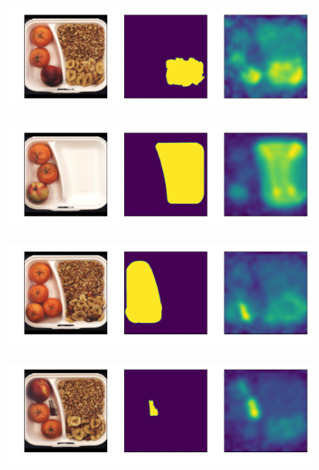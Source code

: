\begin{figure}[htbp]
    \captionsetup[subfigure]{justification=centering}
    \centering
    \begin{subfigure}[b]{0.3\textwidth}
        \centering
        \includegraphics[width=\textwidth]{figures/locopatchcoreresults/breakfast_box_test_logical_anomalies_003.png}

    \end{subfigure}
    \begin{subfigure}[b]{0.3\textwidth}
        \centering
        \includegraphics[width=\textwidth]{figures/locopatchcoreresults/breakfast_box_test_logical_anomalies_034.png}


    \end{subfigure}
    \begin{subfigure}[b]{0.3\textwidth}
        \centering
        \includegraphics[width=\textwidth]{figures/locopatchcoreresults/breakfast_box_test_logical_anomalies_070.png}


    \end{subfigure}
    \begin{subfigure}[b]{0.3\textwidth}
        \centering
        \includegraphics[width=\textwidth]{figures/locopatchcoreresults/breakfast_box_test_structural_anomalies_014.png}


\end{subfigure}
\end{figure}
